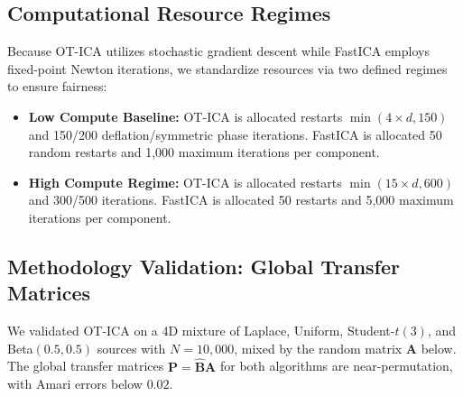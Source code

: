 \documentclass[accepted]{tpm2026} %
\begin{document}
\subsection{Computational Resource Regimes}
Because OT-ICA utilizes stochastic gradient descent while FastICA employs fixed-point Newton iterations, we standardize resources via two defined regimes to ensure fairness:
\begin{itemize}
    \item \textbf{Low Compute Baseline:} OT-ICA is allocated restarts $\min(4 \times d, 150)$ and 150/200 deflation/symmetric phase iterations.
    FastICA is allocated 50 random restarts and 1,000 maximum iterations per component.
    \item \textbf{High Compute Regime:} OT-ICA is allocated restarts $\min(15 \times d, 600)$ and 300/500 iterations.
    FastICA is allocated 50 restarts and 5,000 maximum iterations per component.
\end{itemize}

\subsection{Methodology Validation: Global Transfer Matrices}
\label{app:validation_table}

We validated OT-ICA on a 4D mixture of Laplace, Uniform, Student-$t(3)$, and Beta$(0.5, 0.5)$ sources with $N=10{,}000$, mixed by the random matrix $\mathbf{A}$ below. The global transfer matrices $\mathbf{P} = \hat{\mathbf{B}}\mathbf{A}$ for both algorithms are near-permutation, with Amari errors below $0.02$.
\end{document}
